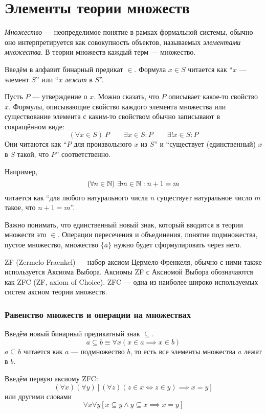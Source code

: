 \part{Элементы теории множеств}

{\it Множество} --- неопределимое понятие в рамках формальной системы,
обычно оно интерпретируется как совокупность объектов,
называемых {\it элементами множества}.
В теории множеств каждый терм --- множество.

Введём в алфавит бинарный предикат $\in$. Формула ${x\in S}$ читается
как ``$x$ --- элемент $S$'' или ``$x$ {\it лежит} в $S$''.

Пусть $P$ --- утверждение о $x$. Можно сказать, что $P$ описывает какое-то
свойство $x$.
Формулы, описывающие свойство каждого элемента множества или
существование элемента с каким-то свойством обычно записывают в сокращённом виде:
\[
	(\forall x\in S)~P\qquad \exists x\in S:P\qquad \exists!x\in S:P
\]
Они читаются как ``$P$ для произвольного $x$ из $S$'' и
``существует (единственный) $x$ в $S$ такой, что $P$'' соответственно.

Например,
\[
	(\forall n\in\mathbb N)~\exists m\in\mathbb N:n+1=m
\]
читается как ``для любого натурального числа $n$ существует натуральное число
$m$ такое, что $n+1=m$''.

Важно понимать, что единственный новый знак, который вводится в теории множеств
это $\in$. Операции пересечения и объединения, понятие подмножества, пустое множество,
множество $\{a\}$ нужно будет сформулировать через него.

ZF (Zermelo-Fraenkel) --- набор аксиом Цермело-Френкеля, обычно с ними также
используется Аксиома Выбора. Аксиомы ZF с Аксиомой Выбора
обозначаются как ZFC (ZF, axiom of Choice).
ZFC --- одна из наиболее широко используемых систем аксиом теории множеств.

\section{Равенство множеств и операции на множествах}

Введём новый бинарный предикатный знак $\subseteq$.
\[
	a\subseteq b\equiv \forall x(x\in a\implies x\in b)
\]
${a\subseteq b}$ читается как $a$ --- подмножество $b$, то есть все
элементы множества $a$ лежат в $b$.

Введём первую аксиому ZFC:
\[
	(\forall x)(\forall y)[(\forall z)(z\in x\iff z\in y)\implies x=y]
\]
или другими словами
\[
	\forall x\forall y[x\subseteq y\land y\subseteq x\implies x=y]
\]

